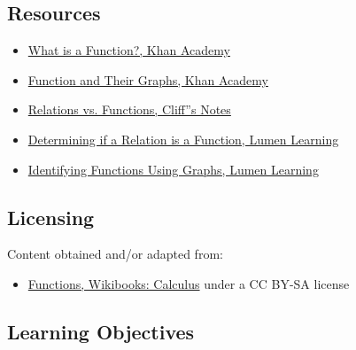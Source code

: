 \subsection{Resources}
\label{sss:reso-55b5}

\begin{itemize}
    \item \href{https://www.khanacademy.org/math/algebra/x2f8bb11595b61c86:functions/x2f8bb11595b61c86:evaluating-functions/v/what-is-a-function}{What is a Function?, Khan Academy}
    \item \href{https://www.khanacademy.org/math/algebra2/functions_and_graphs}{Function and Their Graphs, Khan Academy}
    \item \href{https://www.cliffsnotes.com/study-guides/calculus/precalculus/functions/relations-vs-functions}{Relations vs. Functions, Cliff''s Notes}
    \item \href{https://courses.lumenlearning.com/ivytech-collegealgebra/chapter/determine-whether-a-relation-represents-a-function/}{Determining if a Relation is a Function, Lumen Learning}
    \item \href{https://courses.lumenlearning.com/waymakercollegealgebra/chapter/identify-functions-using-graphs/}{Identifying Functions Using Graphs, Lumen Learning}
\end{itemize}

\subsection{Licensing}
\label{sss:lice-7352}

Content obtained and/or adapted from:

\begin{itemize}
    \item \href{https://en.wikibooks.org/wiki/Calculus/Functions}{Functions, Wikibooks: Calculus} under a CC BY-SA license
\end{itemize}

\subsection{Learning Objectives}
\label{ssec:lear-4795}

